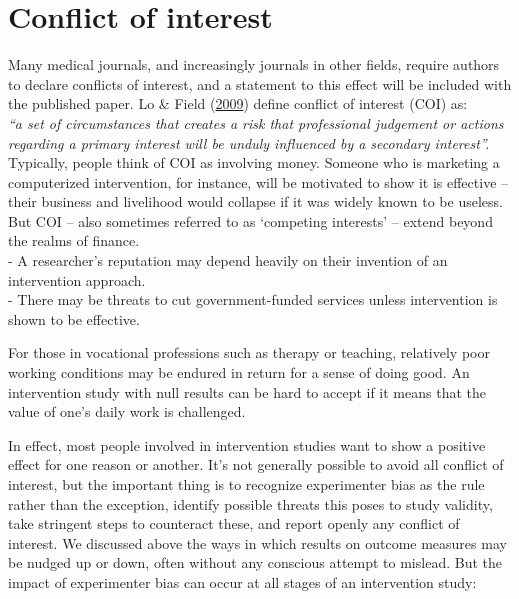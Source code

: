 \documentclass{krantz}
\begin{document}
\hypertarget{conflict-of-interest}{%
\section{Conflict of interest}\label{conflict-of-interest}}

Many medical journals, and increasingly journals in other fields, require authors to declare conflicts of interest, and a statement to this effect will be included with the published paper. Lo \& Field (\protect\hyperlink{ref-lo2009}{2009}) define conflict of interest (COI) as:\\
\emph{``a set of circumstances that creates a risk that professional judgement or actions regarding a primary interest will be unduly influenced by a secondary interest''.}\\
Typically, people think of COI as involving money. Someone who is marketing a computerized intervention, for instance, will be motivated to show it is effective -- their business and livelihood would collapse if it was widely known to be useless. But COI -- also sometimes referred to as `competing interests' -- extend beyond the realms of finance.\\
- A researcher's reputation may depend heavily on their invention of an intervention approach.\\
- There may be threats to cut government-funded services unless intervention is shown to be effective.

For those in vocational professions such as therapy or teaching, relatively poor working conditions may be endured in return for a sense of doing good. An intervention study with null results can be hard to accept if it means that the value of one's daily work is challenged.

In effect, most people involved in intervention studies want to show a positive effect for one reason or another. It's not generally possible to avoid all conflict of interest, but the important thing is to recognize experimenter bias as the rule rather than the exception, identify possible threats this poses to study validity, take stringent steps to counteract these, and report openly any conflict of interest. We discussed above the ways in which results on outcome measures may be nudged up or down, often without any conscious attempt to mislead. But the impact of experimenter bias can occur at all stages of an intervention study:
\end{document}
